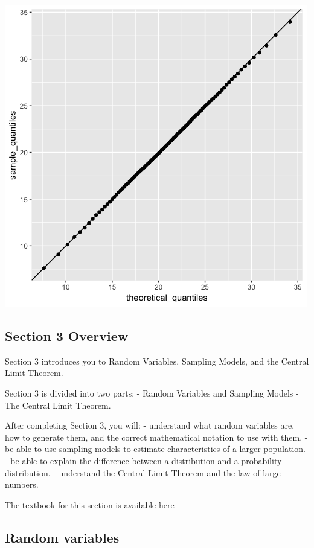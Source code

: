 \documentclass[
]{article}
\begin{document}
\includegraphics{images/sample_theoretical_imageD.png} \newpage

\hypertarget{section-3-overview}{%
\subsection{Section 3 Overview}\label{section-3-overview}}

Section 3 introduces you to Random Variables, Sampling Models, and the
Central Limit Theorem.

Section 3 is divided into two parts: - Random Variables and Sampling
Models - The Central Limit Theorem.

After completing Section 3, you will: - understand what random variables
are, how to generate them, and the correct mathematical notation to use
with them. - be able to use sampling models to estimate characteristics
of a larger population. - be able to explain the difference between a
distribution and a probability distribution. - understand the Central
Limit Theorem and the law of large numbers.

The textbook for this section is available
\href{https://rafalab.github.io/dsbook/random-variables.html}{here}

\hypertarget{random-variables}{%
\subsection{Random variables}\label{random-variables}}
\end{document}
